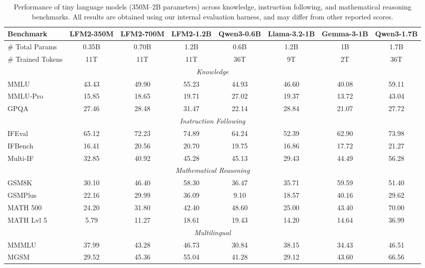 \documentclass{article}
\begin{document}
\clearpage
\begin{table}[tb]
\centering
\small
\setlength{\tabcolsep}{4pt}
\begin{tabular}{lccccccc}
\toprule
\textbf{Benchmark} & \textbf{LFM2-350M} & \textbf{LFM2-700M} & \textbf{LFM2-1.2B} & \textbf{Qwen3-0.6B} & \textbf{Llama-3.2-1B} & \textbf{Gemma-3-1B} & \textbf{Qwen3-1.7B} \\
\midrule
\# Total Params & 0.35B & 0.70B & 1.2B & 0.6B & 1.2B & 1B & 1.7B \\
\# Trained Tokens & 11T & 11T & 11T & 36T & 9T & 2T & 36T \\
\midrule
\multicolumn{8}{c}{\textit{Knowledge}} \\
\midrule
MMLU & 43.43 & 49.90 & 55.23 & 44.93 & 46.60 & 40.08 & 59.11 \\
MMLU-Pro & 15.85 & 18.65 & 19.71 & 27.02 & 19.37 & 13.72 & 43.04 \\
GPQA & 27.46 & 28.48 & 31.47 & 22.14 & 28.84 & 21.07 & 27.72 \\
\midrule
\multicolumn{8}{c}{\textit{Instruction Following}} \\
\midrule
IFEval & 65.12 & 72.23 & 74.89 & 64.24 & 52.39 & 62.90 & 73.98 \\
IFBench & 16.41 & 20.56 & 20.70 & 19.75 & 16.86 & 17.72 & 21.27 \\
Multi-IF & 32.85 & 40.92 & 45.28 & 45.13 & 29.43 & 44.49 & 56.28 \\
\midrule
\multicolumn{8}{c}{\textit{Mathematical Reasoning}} \\
\midrule
GSM8K & 30.10 & 46.40 & 58.30 & 36.47 & 35.71 & 59.59 & 51.40 \\
GSMPlus & 22.16 & 29.99 & 36.09 & 9.10 & 18.57 & 40.16 & 29.62 \\
MATH 500 & 24.20 & 31.80 & 42.40 & 48.60 & 25.00 & 43.40 & 70.00 \\
MATH Lvl 5 & 5.79 & 11.27 & 18.61 & 19.43 & 14.20 & 14.64 & 36.99 \\
\midrule
\multicolumn{8}{c}{\textit{Multilingual}} \\
\midrule
MMMLU & 37.99 & 43.28 & 46.73 & 30.84 & 38.15 & 34.43 & 46.51 \\
MGSM & 29.52 & 45.36 & 55.04 & 41.28 & 29.12 & 43.60 & 66.56 \\
\bottomrule
\end{tabular}
\caption{Performance of tiny language models (350M--2B parameters) across knowledge, instruction following, and mathematical reasoning benchmarks. All results are obtained using our internal evaluation harness, and may differ from other reported scores.}
\label{tab:small_models}
\end{table}
\end{document}
